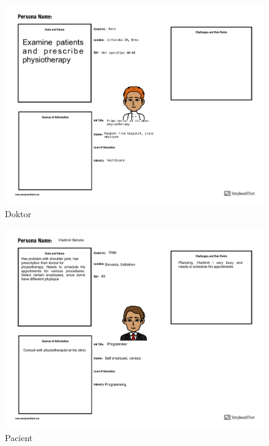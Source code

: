 \newpage
\begin{figure}[h]
    \centering
    \includegraphics[width=1.4\textwidth, angle=270]{doc/latex/fig/vlado/Persona_Worksheets_PDF_dragged.pdf}
    \caption{Doktor}
    \label{fig:pers_doctor}
\end{figure}

\begin{figure}[h]
    \centering
    \includegraphics[width=1.4\textwidth, angle=270]{doc/latex/fig/vlado/Persona_Worksheets_PDF_dragged_2.pdf}
    \caption{Pacient}
    \label{fig:pers_patient}
\end{figure}

